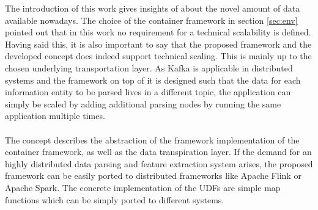 The introduction of this work gives insights of about the novel amount of data available nowadays. The choice of the container framework in section \ref{sec:env} pointed out that in this work no requirement for a technical scalability is defined. Having said this, it is also important to say that the proposed framework and the developed concept does indeed support technical scaling. This is mainly up to the chosen underlying transportation layer. As Kafka is applicable in distributed systems and the framework on top of it is designed such that the data for each information entity to be parsed lives in a different topic, the application can simply be scaled by adding additional parsing nodes by running the same application multiple times.
\\\\
The concept describes the abstraction of the framework implementation of the container framework, as well as the data transpiration layer. If the demand for an highly distributed data parsing and feature extraction system arises, the proposed framework can be easily ported to distributed frameworks like Apache Flink or Apache Spark. The concrete implementation of the UDFs are simple map functions which can be simply ported to different systems.
